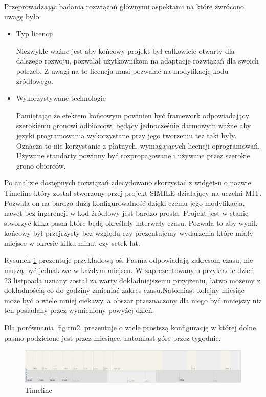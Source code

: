 Przeprowadzając badania rozwiązań głównymi aspektami na które zwrócono uwagę było:


\begin{itemize}

\item

Typ licencji 

Niezwykle ważne jest aby końcowy projekt był całkowicie otwarty dla dalszego rozwoju, pozwalał użytkownikom na adaptację rozwiązań dla swoich potrzeb. Z uwagi na to licencja musi pozwalać na modyfikację kodu źródłowego.

\item

Wykorzystywane technologie

Pamiętając że efektem końcowym powinien być framework odpowiadający szerokiemu gronowi odbiorców, będący jednocześnie darmowym ważne aby języki programowania wykorzystane przy jego tworzeniu też taki były. Oznacza to nie korzystanie z płatnych, wymagających licencji oprogramowań. Używane standarty powinny być rozpropagowane i używane przez szerokie grono obiorców.

\end{itemize}

Po analizie dostępnych rozwiązań zdecydowano skorzystać z widget-u o nazwie Timeline który został stworzony przej projekt SIMILE działający na uczelni MIT. Pozwala on na bardzo dużą konfigurowalność dzięki czemu jego modyfikacja, nawet bez ingerencji w kod źródłowy jest bardzo prosta.
Projekt jest w stanie stworzyć kilka pasm które będą określały interwały czasu. Pozwala to aby wynik końcowy był przejrzysty bez względu czy prezentujemy wydarzenia które miały miejsce w okresie kilku minut czy setek lat.

Rysunek \ref{fig:tm1} prezentuje przykładową oś. Pasma odpowiadają zakresom czasu, nie muszą być jednakowe w każdym miejscu. W zaprezentowanym przykładie dzień 23 listpoada uznany został za warty dokładniejszemu przyjżeniu, łatwo możemy z dokładnością co do godziny zmieniać zakres czasu.Natomiast kolejny miesiąc może być o wiele mniej ciekawy, a obszar przeznaczony dla niego być mniejszy niż ten posiadany przez wymieniony powyżej dzień.

Dla porównania \ref{fig:tm2} prezentuje o wiele prostszą konfigurację w której dolne pasmo podzielone jest przez miesiące, natomiast góre przez tygodnie.

  \begin{figure}[H]
  \centering
    \includegraphics[width=150mm]{ge/tm1.jpg}
  \caption{Timeline}
  \label{fig:tm1}
\end{figure}

